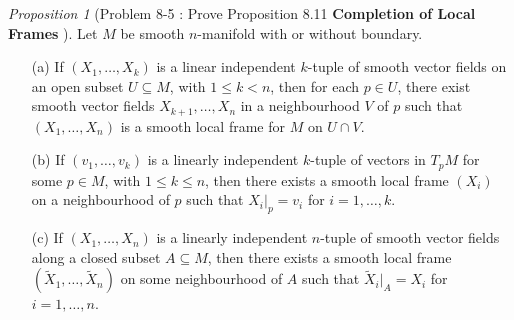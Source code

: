 \documentclass[a4paper]{article}
\theoremstyle{remark}
\newtheorem{prop}{Proposition}
\newcommand{\subhim}{\subseteq} %
\begin{document}
\begin{prop}[Problem 8-5 : Prove Proposition 8.11 \textbf{Completion of Local Frames}  \cite{LeeSM} ] 
Let $M$ be smooth $n$-manifold with or without boundary.
\begin{enumerate}
\item[(a)] If $(X_1,\dots,X_k)$ is a linear independent $k$-tuple of smooth vector fields on an open subset $U \subseteq M$, with $1 \leq k < n$, then for each $p \in U$, there exist smooth vector fields $X_{k+1},\dots,X_n$ in a neighbourhood $V$ of $p$ such that $(X_1,\dots,X_n)$ is a smooth local frame for $M$ on $U \cap V$.
\item[(b)] If $(v_1,\dots,v_k)$ is a linearly independent $k$-tuple of vectors in $T_pM$ for some $p \in M$, with $1\leq k \leq n$, then there exists a smooth local frame $(X_i)$ on a neighbourhood of $p$ such that $X_i|_p = v_i$ for $i =1,\dots,k$. 
\item[(c)] If $(X_1,\dots,X_n)$ is a linearly independent $n$-tuple of smooth vector fields along a closed subset $A\subhim M$, then there exists a smooth local frame $(\widetilde{X}_1,\dots,\widetilde{X}_n)$ on some neighbourhood of $A$ such that $\widetilde{X}_i|_A = X_i$ for $i=1,\dots,n$.
\end{enumerate}
\end{prop}
\end{document}
